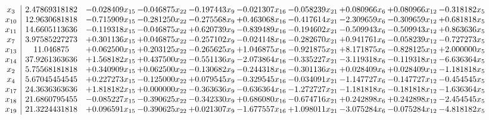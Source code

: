 \documentclass[10pt]{article}
\begin{document}
 \[\begin{array}{c| c c@{\hskip 2pt} c@{\hskip 2pt} c@{\hskip 2pt} c@{\hskip 2pt} c@{\hskip 2pt} c@{\hskip 2pt} c@{\hskip 2pt} c@{\hskip 2pt} }
 x_{3}   &  2.47869318182 & -0.028409 x_{15} & -0.046875 x_{22} & -0.197443 x_{9} & -0.021307 x_{16} & -0.058239 x_{21} & + 0.080966 x_{6} & + 0.080966 x_{12} & -0.318182 x_{5}\\
 x_{10}   &  12.9630681818 & -0.715909 x_{15} & -0.281250 x_{22} & -0.275568 x_{9} & + 0.463068 x_{16} & -0.417614 x_{21} & -2.309659 x_{6} & -0.309659 x_{12} & + 0.681818 x_{5}\\
 x_{11}   &  14.6605113636 & -0.119318 x_{15} & -0.046875 x_{22} & + 0.620739 x_{9} & -0.839489 x_{16} & -0.194602 x_{21} & -0.509943 x_{6} & -0.509943 x_{12} & + 0.863636 x_{5}\\
 x_{7}   &  3.97585227273 & + 0.301136 x_{15} & + 0.046875 x_{22} & -0.257102 x_{9} & -0.024148 x_{16} & -0.282670 x_{21} & + 0.941761 x_{6} & -0.058239 x_{12} & -0.727273 x_{5}\\
 x_{13}   &  11.046875 & + 0.062500 x_{15} & + 0.203125 x_{22} & -0.265625 x_{9} & + 1.046875 x_{16} & -0.921875 x_{21} & + 8.171875 x_{6} & -0.828125 x_{12} & + 2.000000 x_{5}\\
 x_{14}   &  37.9261363636 & + 1.568182 x_{15} & + 0.437500 x_{22} & -0.551136 x_{9} & -2.073864 x_{16} & -0.335227 x_{21} & -3.119318 x_{6} & -0.119318 x_{12} & -6.636364 x_{5}\\
 x_{2}   &  5.75568181818 & + 0.340909 x_{15} & + 0.062500 x_{22} & -0.130682 x_{9} & -0.244318 x_{16} & -0.301136 x_{21} & + 0.028409 x_{6} & + 0.028409 x_{12} & -1.181818 x_{5}\\
 x_{4}   &  5.67045454545 & + 0.227273 x_{15} & -0.125000 x_{22} & + 0.079545 x_{9} & -0.329545 x_{16} & -0.034091 x_{21} & -1.147727 x_{6} & -0.147727 x_{12} & -0.454545 x_{5}\\
 x_{17}   &  24.3636363636 & + 1.818182 x_{15} & + 0.000000 x_{22} & -0.363636 x_{9} & -0.636364 x_{16} & -1.272727 x_{21} & -1.181818 x_{6} & -0.181818 x_{12} & -1.636364 x_{5}\\
 x_{18}   &  21.6860795455 & -0.085227 x_{15} & -0.390625 x_{22} & -0.342330 x_{9} & + 0.686080 x_{16} & -0.674716 x_{21} & + 0.242898 x_{6} & + 0.242898 x_{12} & -2.454545 x_{5}\\
 x_{19}   &  21.3224431818 & + 0.096591 x_{15} & -0.390625 x_{22} & + 0.021307 x_{9} & -1.677557 x_{16} & + 1.098011 x_{21} & -3.075284 x_{6} & -0.075284 x_{12} & -4.818182 x_{5}\\

\end{array}\]
\end{document}

